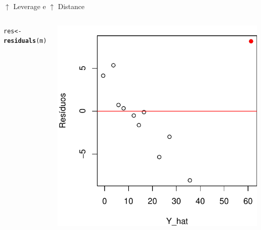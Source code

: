 \documentclass{beamer}\usepackage[]{graphicx}\usepackage[]{color}
\makeatletter
\newcommand{\hlstd}[1]{\textcolor[rgb]{0.345,0.345,0.345}{#1}}%
\newcommand{\hlkwb}[1]{\textcolor[rgb]{0.69,0.353,0.396}{#1}}%
\newcommand{\hlkwd}[1]{\textcolor[rgb]{0.737,0.353,0.396}{\textbf{#1}}}%
\newenvironment{kframe}{%
 \def\at@end@of@kframe{}%
 \ifinner\ifhmode%
  \def\at@end@of@kframe{\end{minipage}}%
  \begin{minipage}{\columnwidth}%
 \fi\fi%
 \def\FrameCommand##1{\hskip\@totalleftmargin \hskip-\fboxsep
 \colorbox{shadecolor}{##1}\hskip-\fboxsep
     \hskip-\linewidth \hskip-\@totalleftmargin \hskip\columnwidth}%
 \MakeFramed {\advance\hsize-\width
   \@totalleftmargin\z@ \linewidth\hsize
   \@setminipage}}%
 {\par\unskip\endMakeFramed%
 \at@end@of@kframe}
\newenvironment{knitrout}{}{} %
\renewenvironment{knitrout}{\setlength{\topsep}{0mm}}{}
\makeatother
\begin{document}
\begin{frame}{$\uparrow$ Leverage e $\uparrow$ Distance}
\begin{columns}[c]
\begin{knitrout}
\end{knitrout}
\pause
{}
\begin{knitrout}\tiny
{}\color{fgcolor}\begin{kframe}
\begin{alltt}
\hlstd{res} \hlkwb{<-} \hlkwd{residuals}\hlstd{(m)}
\end{alltt}
\end{kframe}
\includegraphics[width=1\linewidth]{figure/inf00-1} 

\end{knitrout}

\end{columns}
\end{frame}
\end{document}
